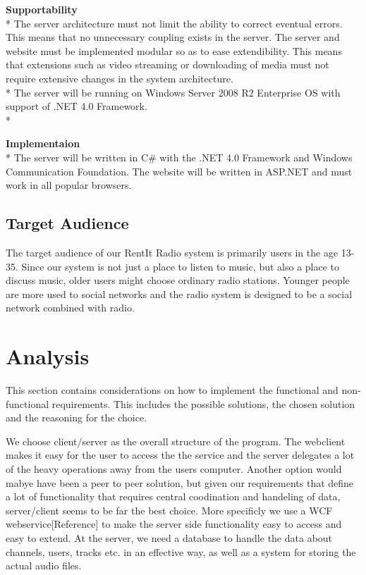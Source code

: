 \documentclass[a4paper,11pt,report]{article}
\begin{document}
\textbf{Supportability} \\*
The server architecture must not limit the ability to correct eventual errors. This means that no unnecessary coupling exists in the server.
The server and website must be implemented modular so as to ease extendibility.
This means that extensions such as video streaming or downloading of media must not require extensive changes in the system architecture. \\*
The server will be running on Windows Server 2008 R2 Enterprise OS with support of .NET 4.0 Framework.\\*

\textbf{Implementaion} \\*
The server will be written in C\# with the .NET 4.0 Framework and Windows Communication Foundation.
The website will be written in ASP.NET and must work in all popular browsers.

\subsection{Target Audience}
The target audience of our RentIt Radio system is primarily users in the age 13-35. Since our system is not just a place to listen to music, but also a place to discuss music,  older users might choose ordinary radio stations. Younger people are more used to social networks and the radio system is designed to be a social network combined with radio.

\section{Analysis}
This section contains considerations on how to implement the functional and non-functional requirements. This includes the possible solutions, the chosen solution and the reasoning for the choice.

We choose client/server as the overall structure of the program. The webclient makes it easy for the user to access the the service and the server delegates a lot of the heavy operations away from the users computer. Another option would mabye have been a peer to peer solution, but given our requirements that define a lot of functionality that requires central coodination and handeling of data, server/client seems to be far the best choice. More specificly we use a WCF webservice[Reference] to make the server side functionality easy to access and easy to extend. At the server, we need a database to handle the data about channels, users, tracks etc. in an effective way, as well as a system for storing the actual audio files. 
\end{document}
